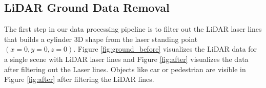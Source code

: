 %
%
%


\subsection{LiDAR Ground Data Removal}
The first step in our data processing pipeline is to filter out the LiDAR laser lines that builds
a cylinder 3D shape from the laser standing point $(x=0, y=0, z=0)$. Figure \ref{fig:ground_before} visualizes the LiDAR 
data for a single scene with LiDAR laser lines and Figure \ref{fig:after} visualizes the data after
filtering out the Laser lines. Objects like car or pedestrian are
visible in Figure \ref{fig:after} after filtering the LiDAR lines.

